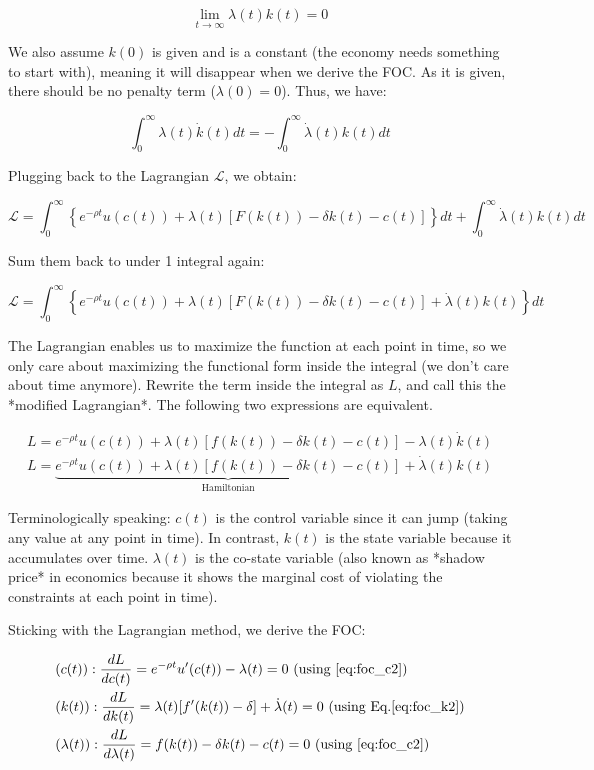 \documentclass[11pt,a4paper]{book}
\theoremstyle{definition}\newtheorem{definition}{Definition}
\theoremstyle{definition}\newtheorem{fact}{Fact}
\theoremstyle{definition}\newtheorem{remark}{Remark}
\theoremstyle{definition}\newtheorem{ex}{Ex.}
\theoremstyle{definition}\newtheorem{project}{Project}
\theoremstyle{definition}\newtheorem{problem}{Problem}
\theoremstyle{definition}\newtheorem{example}{Example}
\numberwithin{theorem}{section}
\numberwithin{corollary}{chapter}
\numberwithin{assumption}{chapter}
\numberwithin{definition}{chapter}
\numberwithin{prop}{chapter}
\numberwithin{notation}{chapter}
\numberwithin{problem}{chapter}
\numberwithin{example}{chapter}
\numberwithin{fact}{chapter}
\numberwithin{ex}{chapter}
\begin{document}
$$
    \lim_{t\to\infty} \lambda(t)k(t) = 0
$$

We also assume $k(0)$ is given and is a constant (the economy needs something to start with), meaning it will disappear when we derive the FOC. As it is given, there should be no penalty term ($\lambda(0) = 0$). Thus, we have:

$$
    \int_{0}^{\infty} \lambda(t)\dot{k}(t) dt = - \int_{0}^{\infty} \dot{\lambda}(t) k(t) dt
$$

Plugging back to the Lagrangian $\mathcal{L}$, we obtain:

$$
    \mathcal{L} = \int_{0}^{\infty} \left\{ e^{-\rho t} u(c(t)) + \lambda(t) \left[ F( k(t)) - \delta k(t) - c(t)  \right] \right\} dt + \int_{0}^{\infty} \dot{\lambda}(t)k(t)dt 
$$

Sum them back to under 1 integral again:

$$
    \mathcal{L} = \int_{0}^{\infty} \left\{ e^{-\rho t} u(c(t)) + \lambda(t) \left[ F( k(t)) - \delta k(t) - c(t)  \right] +  \dot{\lambda}(t)k(t) \right\} dt 
$$

The Lagrangian enables us to maximize the function at each point in time, so we only care about maximizing the functional form inside the integral (we don't care about time anymore). Rewrite the term inside the integral as $L$, and call this the *modified Lagrangian*. The following two expressions are equivalent.

\begin{align}
     L = {e^{-\rho t} u(c(t)) + \lambda(t) \left[ f( k(t)) - \delta k(t) - c(t)  \right]} -  \lambda(t)\dot{k}(t)     \label{eq:foc_c2} \\                            
     L =  \underbrace{e^{-\rho t} u(c(t)) + \lambda(t) \left[ f( k(t)) - \delta k(t) - c(t)  \right]}_{\text{Hamiltonian}}+  \dot{\lambda}(t)k(t)  \label{eq:foc_k2}
\end{align}

Terminologically speaking: $c(t)$ is the control variable since it can jump (taking any value at any point in time). In contrast, $k(t)$ is the state variable because it accumulates over time. ${\lambda}(t)$ is the co-state variable (also known as *shadow price* in economics because it shows the marginal cost of violating the constraints at each point in time). 

Sticking with the Lagrangian method, we derive the FOC:

\begin{align}
     &(c(t)): \frac{dL}{d c(t)} = e^{-\rho t} u'(c(t)) - \lambda(t) = 0\  \text{(using \eqref{eq:foc_c2})}     \\   
     &(k(t)): \frac{dL}{d k(t)} = \lambda(t) [ f'(k(t)) - \delta] + \dot{\lambda}(t) = 0 \ \text{(using Eq.\eqref{eq:foc_k2})} \\
     &(\lambda(t)): \frac{dL}{d \lambda(t)} = f(k(t)) - \delta k(t) - c(t) = 0 \ \text{(using \eqref{eq:foc_c2})}           
\end{align}
\end{document}
